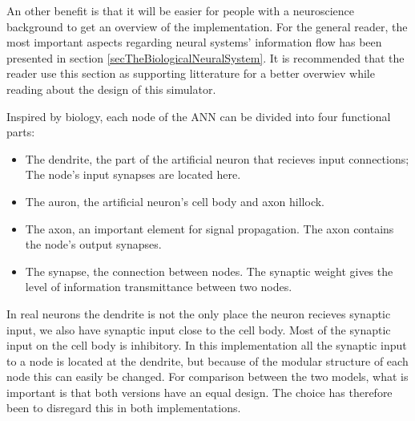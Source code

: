 		An other benefit is that it will be easier for people with a neuroscience background to get an overview of the implementation.
		For the general reader, the most important aspects regarding neural systems' information flow has been presented in section \ref{secTheBiologicalNeuralSystem}. %
		It is recommended that the reader use this section as supporting litterature for a better overwiev while reading about the design of this simulator.


		Inspired by biology, each node of the ANN can be divided into four functional parts:
		\begin{itemize}
			\item The dendrite, the part of the artificial neuron that recieves input connections; The node's input synapses are located here.
			\item The auron, the artificial neuron's cell body and axon hillock.
			\item The axon, an important element for signal propagation. The axon contains the node's output synapses. %
			\item The synapse, the connection between nodes. The synaptic weight gives the level of information transmittance between two nodes.
		\end{itemize}
		In real neurons the dendrite is not the only place the neuron recieves synaptic input, we also have synaptic input close to the cell body.
		Most of the synaptic input on the cell body is inhibitory\cite{PrinciplesOfNeuralScience4edKAP12}.
		In this implementation all the synaptic input to a node is located at the dendrite, but because of the modular structure of each node this can easily be changed.
		For comparison between the two models, what is important is that both versions have an equal design.
		The choice has therefore been to disregard this in both implementations.




